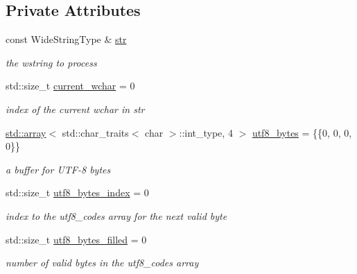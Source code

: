\subsection*{Private Attributes}
\begin{DoxyCompactItemize}
\item 
const Wide\+String\+Type \& \hyperlink{classnlohmann_1_1detail_1_1wide__string__input__adapter_a30fcb522f072d58eb0fb52cfb784e9c9}{str}
\begin{DoxyCompactList}\small\item\em the wstring to process \end{DoxyCompactList}\item 
std\+::size\+\_\+t \hyperlink{classnlohmann_1_1detail_1_1wide__string__input__adapter_a196fe1fb07310dc8c2ca3a0a9ef9b27a}{current\+\_\+wchar} = 0
\begin{DoxyCompactList}\small\item\em index of the current wchar in str \end{DoxyCompactList}\item 
\hyperlink{namespacenlohmann_1_1detail_a1ed8fc6239da25abcaf681d30ace4985af1f713c9e000f5d3f280adbd124df4f5}{std\+::array}$<$ std\+::char\+\_\+traits$<$ char $>$\+::int\+\_\+type, 4 $>$ \hyperlink{classnlohmann_1_1detail_1_1wide__string__input__adapter_af0854ae66725357d074912379a235128}{utf8\+\_\+bytes} = \{\{0, 0, 0, 0\}\}
\begin{DoxyCompactList}\small\item\em a buffer for U\+T\+F-\/8 bytes \end{DoxyCompactList}\item 
std\+::size\+\_\+t \hyperlink{classnlohmann_1_1detail_1_1wide__string__input__adapter_a6d87bc3e8b427e06cda936383283e0c4}{utf8\+\_\+bytes\+\_\+index} = 0
\begin{DoxyCompactList}\small\item\em index to the utf8\+\_\+codes array for the next valid byte \end{DoxyCompactList}\item 
std\+::size\+\_\+t \hyperlink{classnlohmann_1_1detail_1_1wide__string__input__adapter_a9fc33bf0974526336e53ea530c7097ff}{utf8\+\_\+bytes\+\_\+filled} = 0
\begin{DoxyCompactList}\small\item\em number of valid bytes in the utf8\+\_\+codes array \end{DoxyCompactList}\end{DoxyCompactItemize}


